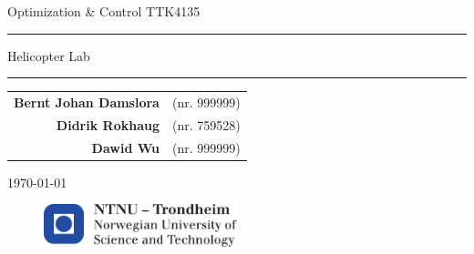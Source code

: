 
\begin{titlepage}
    \begin{center}
    	\large
    	Optimization \& Control TTK4135
    \end{center}
    \vspace{\fill}
    \rule{\linewidth}{0.5mm}
    \begin{center}
    	\huge
    	Helicopter Lab
    \end{center}
	\rule{\linewidth}{0.5mm}
	\vspace{\fill}

    \large
    \centering
    \begin{table}[H]
    	\centering
    	\large
    	\begin{tabular}{rl}
            \textbf{Bernt Johan Damslora} & (nr. 999999) \\
    		\textbf{Didrik Rokhaug} &  (nr. 759528)\\
            \textbf{Dawid Wu} & (nr. 999999)
    	\end{tabular}
    \end{table}
    \vspace{\fill}
    \begin{center}
    	\large
    	\today
    \end{center}
	\vspace{\fill}
    \begin{figure}[H]
    \centering
    \includegraphics[width=0.5\textwidth]{logontnu_eng}
    \end{figure}
    \thispagestyle{empty}
\end{titlepage}
